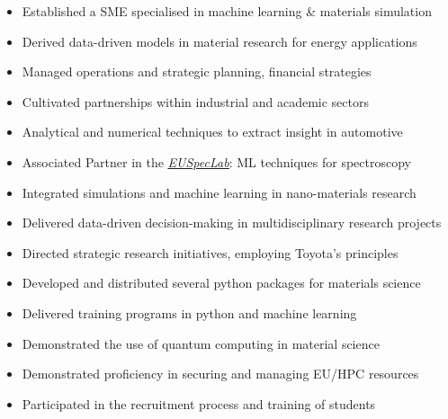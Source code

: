 \documentclass[10pt,a4paper,ragged2e,withhyper]{altacv}
\begin{document}
\begin{paracol}{2}



\begin{itemize}
\item Established a SME specialised in machine learning \& materials simulation
\item Derived data-driven models in material research for energy applications
\item Managed operations and strategic planning, financial strategies
\item Cultivated partnerships within industrial and academic sectors
\item Analytical and numerical techniques to extract insight in automotive
\item Associated Partner in the  \href{https://euspeclab.cnrs.fr/}{\underline{\emph{EUSpecLab}}}: ML techniques for  spectroscopy
\end{itemize}
\divider

\begin{itemize}
\item Integrated simulations and machine learning in nano-materials research
\item Delivered data-driven decision-making in multidisciplinary research projects
\item Directed strategic research initiatives, employing Toyota’s principles 
\item Developed and distributed  several python packages for materials science
\item Delivered training programs in python and machine learning
\item Demonstrated the use of quantum computing in material science
\item Demonstrated proficiency in securing and managing EU/HPC resources
\item Participated in the recruitment process and training of students
\end{itemize}
\divider


\end{paracol}
\end{document}
